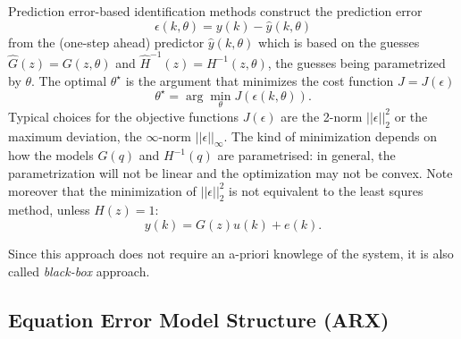 Prediction error-based identification methods construct the prediction error
\begin{equation*}
  \epsilon(k,\theta) = y(k) - \hat{y}(k,\theta)
\end{equation*}
from the (one-step ahead) predictor $\hat{y}(k,\theta)$ which is based on the guesses $\hat{G}(z)=G(z,\theta)$ and $\hat{H}^{-1}(z)=H^{-1}(z,\theta)$, the guesses being parametrized by $\theta$. The optimal $\theta^\star$ is the argument that minimizes the cost function $J=J(\epsilon)$
\begin{equation*}
  \theta^\star = \arg \min_\theta J(\epsilon(k,\theta)).
\end{equation*}
Typical choices for the objective functions $J(\epsilon)$ are the 2-norm $||\epsilon||_2^2$ or the maximum deviation, the $\infty$-norm $||\epsilon||_\infty$. The kind of minimization depends on how the models $G(q)$ and $H^{-1}(q)$ are parametrised: in general, the parametrization will not be linear and the optimization may not be convex. Note moreover that the minimization of $||\epsilon||_2^2$ is not equivalent to the least squres method, unless  $H(z)=1$:
\begin{equation*}
  y(k) = G(z)u(k) + e(k).
\end{equation*}

Since this approach does not require an a-priori knowlege of the system, it is also called \emph{black-box} approach.

\subsection{Equation Error Model Structure (ARX)}
\label{sec:ARX}


